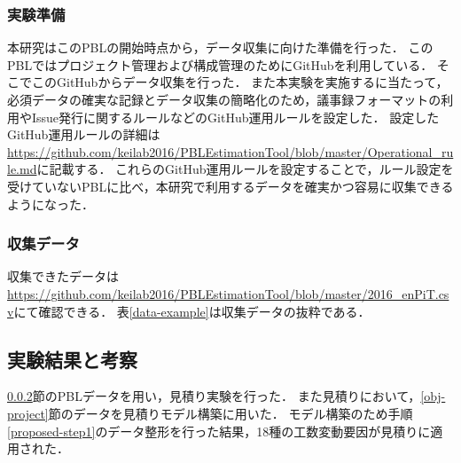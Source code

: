 \documentclass{compsoft}
\begin{document}
\subsubsection{実験準備} \label{enPiT-exp-preparation}

本研究はこのPBLの開始時点から，データ収集に向けた準備を行った．
このPBLではプロジェクト管理および構成管理のためにGitHubを利用している\cite{github}．
そこでこのGitHubからデータ収集を行った．
また本実験を実施するに当たって，必須データの確実な記録とデータ収集の簡略化のため，議事録フォーマットの利用やIssue発行に関するルールなどのGitHub運用ルールを設定した．
設定したGitHub運用ルールの詳細は\url{https://github.com/keilab2016/PBLEstimationTool/blob/master/Operational_rule.md}に記載する．
これらのGitHub運用ルールを設定することで，ルール設定を受けていないPBLに比べ，本研究で利用するデータを確実かつ容易に収集できるようになった．

\subsubsection{収集データ} \label{enPiT-data}
収集できたデータは\url{https://github.com/keilab2016/PBLEstimationTool/blob/master/2016_enPiT.csv}にて確認できる．
表\ref{data-example}は収集データの抜粋である．
\begin{table}[ht]
\caption{収集データ例}
\label{data-example}
\centering
{}
\end{table}


\subsection{実験結果と考察} \label{enPiT-exp}
\ref{enPiT-data}節のPBLデータを用い，見積り実験を行った．
また見積りにおいて，\ref{obj-project}節のデータを見積りモデル構築に用いた．
モデル構築のため手順\ref{proposed-step1}のデータ整形を行った結果，18種の工数変動要因が見積りに適用された．
\end{document}
